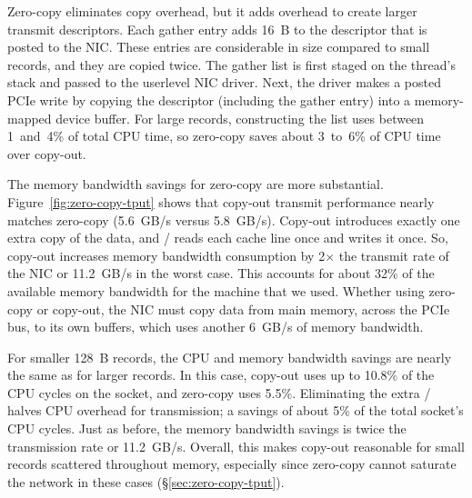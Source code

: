 Zero-copy eliminates copy overhead, but it adds overhead to create
larger transmit descriptors.  Each gather entry adds
16~B to the descriptor that is posted to the NIC.
These entries are considerable in size compared to
small records, and they are copied twice. The gather list
is first staged on the thread's stack and passed to the userlevel NIC driver. Next,
the driver makes a posted PCIe write by copying the descriptor (including the
gather entry) into a memory-mapped device buffer.  For large records,
constructing the list uses between 1~and~4\% of total CPU time, so zero-copy
saves about 3~to~6\% of CPU time over copy-out.

The memory bandwidth savings for zero-copy are more substantial.
Figure~\ref{fig:zero-copy-tput} shows that copy-out transmit performance nearly
matches zero-copy (5.6~GB/s versus 5.8~GB/s). Copy-out introduces exactly one
extra copy of the data, and \memcpy/  reads each cache line once and writes it
once. So, copy-out increases memory bandwidth consumption
by 2$\times$ the transmit rate of the NIC or 11.2~GB/s in the worst case.  This
accounts for about 32\% of the available memory bandwidth for the machine that we used. Whether
using zero-copy or copy-out, the NIC must
copy data from main memory, across the PCIe bus, to its own buffers, which
uses another 6~GB/s of memory bandwidth.


For smaller 128~B records, the CPU and memory bandwidth savings are nearly the
same as for larger records.  In this case, copy-out uses up to 10.8\% of the
CPU cycles on the socket, and zero-copy uses 5.5\%.  Eliminating the extra
\memcpy/  halves CPU overhead for transmission; a savings of about 5\% of the
total socket's CPU cycles.  Just as before, the memory bandwidth savings is
twice the transmission rate or 11.2~GB/s.  Overall, this makes copy-out
reasonable for small records scattered throughout memory, especially since zero-copy cannot saturate the network in these cases (\S\ref{sec:zero-copy-tput}).

